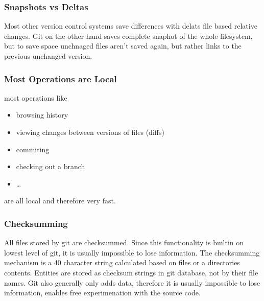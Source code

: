 \documentclass[a4paper,10pt,english]{jupyterBook}
\begin{document}
\subsubsection{Snapshots vs Deltas}
\label{\detokenize{text/progtut/gitstart:snapshots-vs-deltas}}
\sphinxAtStartPar
Most other version control systems save differences with delats \sphinxhyphen{} file based relative changes.
Git on the other hand saves complete snaphot of the whole filesystem, but to save space unchnaged files aren’t saved again, but rather links to the previous unchanged version.

\sphinxAtStartPar
{}

\sphinxAtStartPar
{}


\subsubsection{Most Operations are Local}
\label{\detokenize{text/progtut/gitstart:most-operations-are-local}}
\sphinxAtStartPar
most operations like
\begin{itemize}
\item {} 
\sphinxAtStartPar
browsing history

\item {} 
\sphinxAtStartPar
viewing changes between versions of files (diffs)

\item {} 
\sphinxAtStartPar
commiting

\item {} 
\sphinxAtStartPar
checking out a branch

\item {} 
\sphinxAtStartPar
…

\end{itemize}

\sphinxAtStartPar
are all local and therefore very fast.


\subsubsection{Checksumming}
\label{\detokenize{text/progtut/gitstart:checksumming}}
\sphinxAtStartPar
All files stored by git are checksummed. Since this functionality is built\sphinxhyphen{}in on lowest level of git, it is usually impossible to lose information.
The checksumming mechanism is  \sphinxhyphen{} a 40 character string calculated based on files or a directories contents.
Entities are stored as checksum strings in git database, not by their file names.
Git also generally only adds data, therefore it is usually impossible to lose information, enables free experimenation with the source code.
\end{document}
